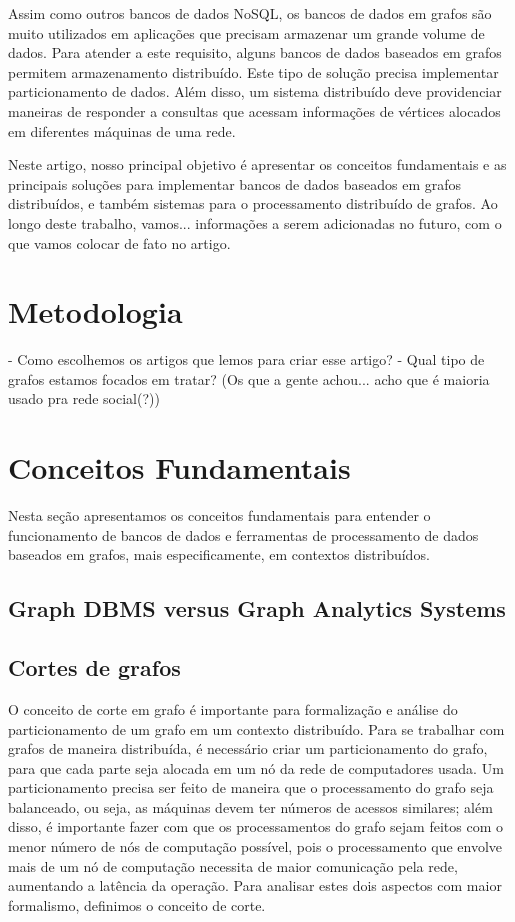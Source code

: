 \documentclass[conference]{IEEEtran}
\begin{document}
Assim como outros bancos de dados NoSQL, os bancos de dados em grafos
são muito utilizados em aplicações que precisam armazenar um grande 
volume de dados. Para atender a este requisito, alguns bancos de dados
baseados em grafos permitem armazenamento distribuído. Este tipo de 
solução precisa implementar particionamento de dados. Além disso, um 
sistema distribuído deve providenciar maneiras de responder a consultas 
que acessam informações de vértices alocados em diferentes máquinas de
uma rede. 

Neste artigo, nosso principal objetivo é apresentar os conceitos 
fundamentais e as principais soluções para implementar bancos de dados
baseados em grafos distribuídos, e também sistemas para o processamento
distribuído de grafos. Ao longo deste trabalho, vamos... {\color{blue} 
informações a serem adicionadas no futuro, com o que vamos colocar de
fato no artigo}.

\section{Metodologia}
- Como escolhemos os artigos que lemos para criar esse artigo?
- Qual tipo de grafos estamos focados em tratar? (Os que a gente achou...
acho que é maioria usado pra rede social(?))

\section{Conceitos Fundamentais}
Nesta seção apresentamos os conceitos fundamentais para entender o 
funcionamento de bancos de dados e ferramentas de processamento de dados
baseados em grafos, mais especificamente, em contextos distribuídos.

\subsection{Graph DBMS versus Graph Analytics Systems}

\subsection{Cortes de grafos}
O conceito de corte em grafo é importante para formalização e análise
do particionamento de um grafo em um contexto distribuído. Para se 
trabalhar com grafos de maneira distribuída, é necessário criar um 
particionamento do grafo, para que cada parte seja alocada em um nó da 
rede de computadores usada. Um particionamento precisa ser feito de 
maneira que o processamento do grafo seja balanceado, ou seja, as 
máquinas devem ter números de acessos similares; além disso, é 
importante fazer com que os processamentos do grafo sejam feitos com o 
menor número de nós de computação possível, pois o processamento que 
envolve mais de um nó de computação necessita de maior comunicação pela 
rede, aumentando a latência da operação. Para analisar estes dois
aspectos com maior formalismo, definimos o conceito de corte.
\end{document}

